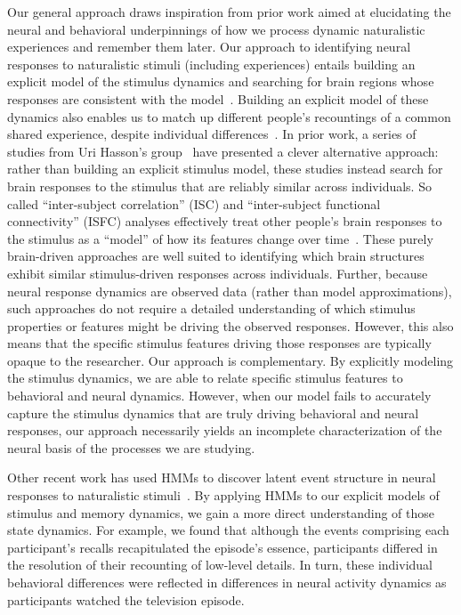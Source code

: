 \documentclass[10pt]{article}
\begin{document}
Our general approach draws inspiration from prior work aimed at elucidating the neural and behavioral underpinnings of how we process dynamic naturalistic experiences and remember them later.  Our approach to identifying neural responses to naturalistic stimuli (including experiences) entails building an explicit model of the stimulus dynamics and searching for brain regions whose responses are consistent with the model~\citep[also see][]{HuthEtal12, HuthEtal16}.  Building an explicit model of these dynamics also enables us to match up different people's recountings of a common shared experience, despite individual differences~\cite[also see][]{GagnEtal20}.  In prior work, a series of studies from Uri Hasson's group~\citep{LernEtal11, SimoEtal16, ChenEtal17, BaldEtal17, ZadbEtal17} have presented a clever alternative approach: rather than building an explicit stimulus model, these studies instead search for brain responses to the stimulus that are reliably similar across individuals.  So called ``inter-subject correlation'' (ISC) and ``inter-subject functional connectivity'' (ISFC) analyses effectively treat other people's brain responses to the stimulus as a ``model'' of how its features change over time~\citep[also see][]{SimoChan20}.  These purely brain-driven approaches are well suited to identifying which brain structures exhibit similar stimulus-driven responses across individuals.  Further, because neural response dynamics are observed data (rather than model approximations), such approaches do not require a detailed understanding of which stimulus properties or features might be driving the observed responses.  However, this also means that the specific stimulus features driving those responses are typically opaque to the researcher.  Our approach is complementary.  By explicitly modeling the stimulus dynamics, we are able to relate specific stimulus features to behavioral and neural dynamics.  However, when our model fails to accurately capture the stimulus dynamics that are truly driving behavioral and neural responses, our approach necessarily yields an incomplete characterization of the neural basis of the processes we are studying.

Other recent work has used HMMs to discover latent event structure in neural responses to naturalistic stimuli~\citep{BaldEtal17}.  By applying HMMs to our explicit models of stimulus and memory dynamics, we gain a more direct understanding of those state dynamics.  For example, we found that although the events comprising each participant's recalls recapitulated the episode's essence, participants differed in the resolution of their recounting of low-level details.  In turn, these individual behavioral differences were reflected in differences in neural activity dynamics as participants watched the television episode.
\end{document}
